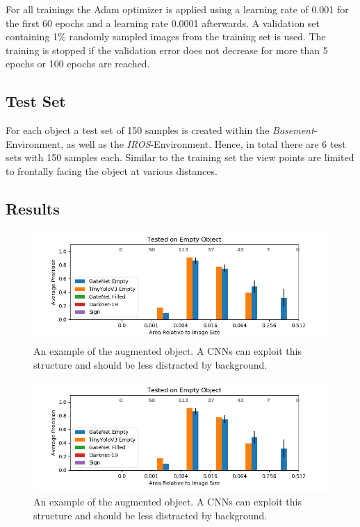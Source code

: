 For all trainings the Adam optimizer is applied using a learning rate of 0.001 for the first 60 epochs and a learning rate 0.0001 afterwards. A validation set containing 1\% randomly sampled images from the training set is used. The training is stopped if the validation error does not decrease for more than 5 epochs or 100 epochs are reached.

\subsection{Test Set}

For each object a test set of 150 samples is created within the \textit{Basement}-Environment, as well as the \textit{IROS}-Environment. Hence, in total there are 6 test sets with 150 samples each. Similar to the training set the view points are limited to frontally facing the object at various distances.


\subsection{Results}

\begin{figure}
	\includegraphics[width=\textwidth]{fig/basement_gate_size}
	\caption{An example of the augmented object. A \acp{CNN} can exploit this structure and should be less distracted by background.}
	\label{fig:basement_gate}
\end{figure}

\begin{figure}
	\includegraphics[width=\textwidth]{fig/basement_gate_size}
	\caption{An example of the augmented object. A \acp{CNN} can exploit this structure and should be less distracted by background.}
	\label{fig:basement_sign}
\end{figure}


